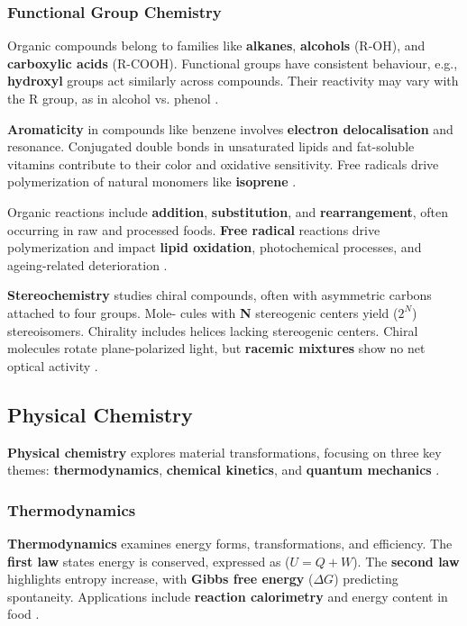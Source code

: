 \subsubsection*{Functional Group Chemistry}
Organic compounds belong to families like \textbf{alkanes}, \textbf{alcohols} (R-OH), and \textbf{carboxylic acids} (R-COOH). Functional groups have consistent behaviour, e.g., \textbf{hydroxyl} groups act similarly across compounds. Their reactivity may vary with the R group, as in alcohol vs. phenol \cite*{BKR_01}.

\textbf{Aromaticity} in compounds like benzene involves \textbf{electron delocalisation} and resonance. Conjugated double bonds in unsaturated lipids and fat-soluble vitamins contribute to their color and oxidative sensitivity. Free radicals drive polymerization of natural monomers like \textbf{isoprene} \cite*{BKR_01}.

Organic reactions include \textbf{addition}, \textbf{substitution}, and \textbf{rearrangement}, often occurring in raw and processed foods. \textbf{Free radical} reactions drive polymerization and impact \textbf{lipid oxidation}, photochemical processes, and ageing-related deterioration \cite*{BKR_01}.

\textbf{Stereochemistry} studies chiral compounds, often with asymmetric carbons attached to four groups. Mole- cules with \textbf{N} stereogenic centers yield ($2^N$) stereoisomers. Chirality includes helices lacking stereogenic centers. Chiral molecules rotate plane-polarized light, but \textbf{racemic mixtures} show no net optical activity \cite*{BKR_01}.

\subsection*{Physical Chemistry}
\textbf{Physical chemistry} explores material transformations, focusing on three key themes: \textbf{thermodynamics}, \textbf{chemical kinetics}, and \textbf{quantum mechanics} \cite*{BKR_01}.

\subsubsection*{Thermodynamics}
\textbf{Thermodynamics} examines energy forms, transformations, and efficiency. The \textbf{first law} states energy is conserved, expressed as ($U=Q+W$). The \textbf{second law} highlights entropy increase, with \textbf{Gibbs free energy} ($\Delta G $) predicting spontaneity. Applications include \textbf{reaction calorimetry} and energy content in food \cite*{BKR_01}.

